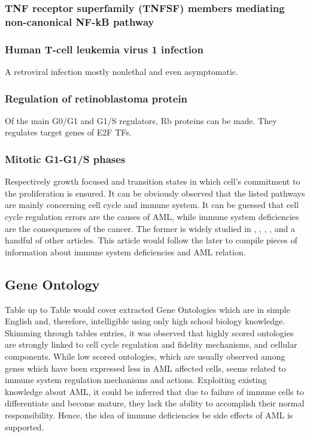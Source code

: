 \documentclass[3p,authoryear,preprint,12pt]{elsarticle}
\begin{document}
\subsubsection{TNF receptor superfamily (TNFSF) members mediating non-canonical NF-kB pathway}

\subsubsection{Human T-cell leukemia virus 1 infection}
A retroviral infection mostly nonlethal and even asymptomatic. %

\subsubsection{Regulation of retinoblastoma protein}
Of the main G0/G1 and G1/S regulators, Rb proteins can be made. They regulates target genes of E2F TFs. %

\subsubsection{Mitotic G1-G1/S phases}
Respectively growth focused and transition states in which cell's commitment to the proliferation is ensured. %
\newline \newline
It can be obviously observed that the listed pathways are mainly concerning cell cycle and immune system. It can be guessed that cell cycle regulation errors are the causes of AML, while immune system deficiencies are the consequences of the cancer. The former is widely studied in %
, %
, %
, %
, and a handful of other articles. This article would follow the later to compile pieces of information about immune system deficiencies and AML relation.

\subsection{Gene Ontology}
Table %
up to Table %
would cover extracted Gene Ontologies which are in simple English and, therefore, intelligible using only high school biology knowledge.
Skimming through tables entries, it was observed that highly scored ontologies are strongly linked to cell cycle regulation and fidelity mechanisms, and cellular components. While low scored ontologies, which are usually observed among genes which have been expressed less in AML affected cells, seems related to immune system regulation mechanisms and actions. Exploiting existing knowledge about AML, it could be inferred that due to failure of immune cells to differentiate and become mature, they lack the ability to accomplish their normal responsibility. Hence, the idea of immune deficiencies be side effects of AML is supported.
\end{document}
